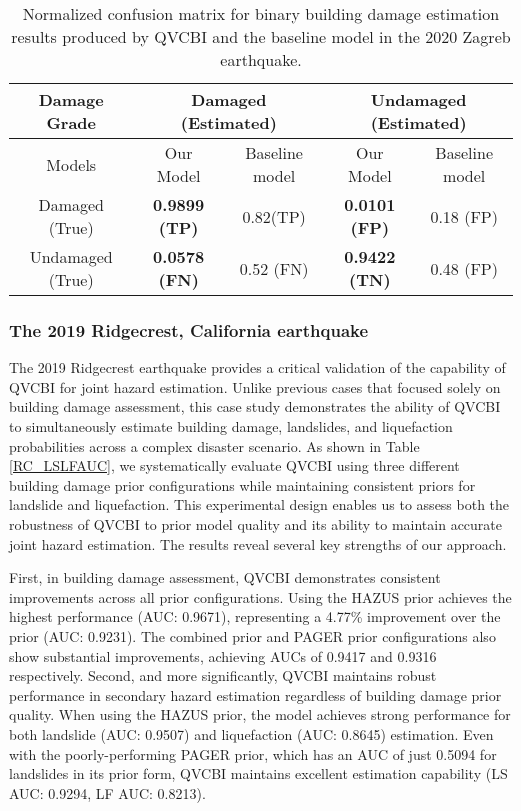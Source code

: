 \documentclass[review]{elsarticle}
\begin{document}
 \begin{table*}[t]
 \caption{Normalized confusion matrix for binary building damage estimation results produced by QVCBI and the baseline model\cite{rao2022earthquake} in the 2020 Zagreb earthquake.}
 \centering
 \begin{tabular}{|c|c|c|c|c|}
\toprule
Damage Grade &\multicolumn{2}{|c|}{Damaged (Estimated)
} & \multicolumn{2}{|c|}{Undamaged (Estimated)
}\\
\hline
Models & Our Model & Baseline model &  Our Model & Baseline model\\
\hline
Damaged (True) &  \textbf{0.9899 (TP)} & 0.82(TP)& \textbf{0.0101 (FP)} & 0.18 (FP)  \\
\hline
Undamaged (True) & \textbf{0.0578 (FN)} & 0.52 (FN) & \textbf{0.9422 (TN)} & 0.48 (FP)\\
\bottomrule
 \end{tabular}
 \label{conf_Zag_1}
 \end{table*}



\subsubsection{The 2019 Ridgecrest, California earthquake}

The 2019 Ridgecrest earthquake provides a critical validation of the capability of QVCBI for joint hazard estimation. Unlike previous cases that focused solely on building damage assessment, this case study demonstrates the ability of QVCBI to simultaneously estimate building damage, landslides, and liquefaction probabilities across a complex disaster scenario. As shown in Table \ref{RC_LSLFAUC}, we systematically evaluate QVCBI using three different building damage prior configurations while maintaining consistent priors for landslide and liquefaction. This experimental design enables us to assess both the robustness of QVCBI to prior model quality and its ability to maintain accurate joint hazard estimation. The results reveal several key strengths of our approach.

First, in building damage assessment, QVCBI demonstrates consistent improvements across all prior configurations. Using the HAZUS prior achieves the highest performance (AUC: 0.9671), representing a 4.77\% improvement over the prior (AUC: 0.9231). The combined prior and PAGER prior configurations also show substantial improvements, achieving AUCs of 0.9417 and 0.9316 respectively. Second, and more significantly, QVCBI maintains robust performance in secondary hazard estimation regardless of building damage prior quality. When using the HAZUS prior, the model achieves strong performance for both landslide (AUC: 0.9507) and liquefaction (AUC: 0.8645) estimation. Even with the poorly-performing PAGER prior, which has an AUC of just 0.5094 for landslides in its prior form, QVCBI maintains excellent estimation capability (LS AUC: 0.9294, LF AUC: 0.8213).
\end{document}

